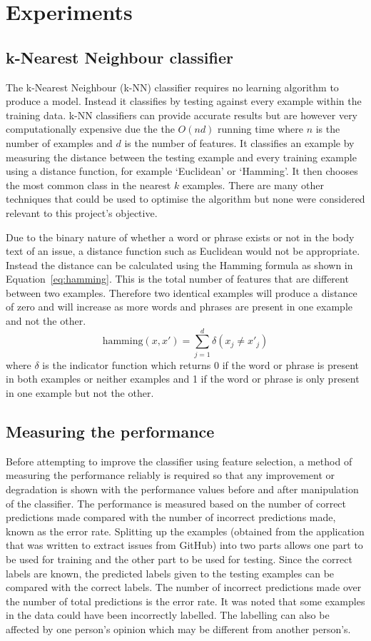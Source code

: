 \section{Experiments}
\subsection{k-Nearest Neighbour classifier}
The k-Nearest Neighbour (k-NN) classifier requires no learning algorithm to produce a model. Instead it classifies by testing against every example within the training data. k-NN classifiers can provide accurate results but are however very
computationally expensive due the the $O(nd)$ running time where $n$ is the number of examples and $d$ is the number of
features. It classifies an example by measuring the distance between the testing example and every training example using a
distance function, for example `Euclidean' or `Hamming'. It then chooses the most common class in the nearest $k$ examples.
There are many other techniques that could be used to optimise the algorithm but none were considered relevant to this project's objective.

Due to the binary nature of whether a word or phrase exists or not in the body text of an issue, a distance function such as
Euclidean would not be appropriate. Instead the distance can be calculated using the Hamming formula as shown in
Equation~\ref{eq:hamming}. This is the total number of features that are different between two examples. Therefore two identical
examples will produce a distance of zero and will increase as more words and phrases are present in one example and not
the other.
\begin{equation}
    \label{eq:hamming}
    \mathrm{hamming}(x,x') = \sum^d_{j=1} \delta (x_{j} \neq x'_{j})
\end{equation}
where $\delta$ is the indicator function which returns 0 if the word or phrase is present in both examples or neither examples
and 1 if the word or phrase is only present in one example but not the other.

\subsection{Measuring the performance}
Before attempting to improve the classifier using feature selection, a method of measuring the performance reliably is required
so that any improvement or degradation is shown with the performance values before and after manipulation of the classifier. The
performance is measured based on the number of correct predictions made compared with the number of incorrect predictions made,
known as the error rate. Splitting up the examples (obtained from the application that was written to extract issues from
GitHub) into two parts allows one part to be used for training and the other part to be used for testing. Since the correct
labels are known, the predicted labels given to the testing examples can be compared with the correct labels. The number of
incorrect predictions made over the number of total predictions is the error rate. It was noted that some examples in the data
could have been incorrectly labelled. The labelling can also be affected by one person's opinion which may be different from
another person's.

